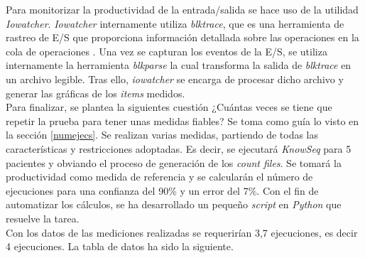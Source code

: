 


Para monitorizar la productividad de la entrada/salida se hace uso de la utilidad \textit{Iowatcher}. \textit{Iowatcher} internamente utiliza \textit{blktrace}, que es una herramienta de rastreo de E/S que proporciona información detallada sobre las operaciones en la cola de operaciones \cite{blktrace}. Una vez se capturan los eventos de la E/S, se utiliza internamente la herramienta \textit{blkparse} la cual transforma la salida de \textit{blktrace} en un archivo legible. Tras ello, \textit{iowatcher} se encarga de procesar dicho archivo y generar las gráficas de los \textit{items} medidos.\\

Para finalizar, se plantea la siguientes cuestión ¿Cuántas veces se tiene que repetir la prueba para tener unas medidas fiables? Se toma como guía lo visto en la sección \ref{numejecs}. Se realizan varias medidas, partiendo de todas las características y restricciones adoptadas. Es decir, se ejecutará \textit{KnowSeq} para 5 pacientes y obviando el proceso de generación de los \textit{count files}. Se tomará la productividad como medida de referencia y se calcularán el número de ejecuciones para una confianza del 90\% y un error del 7\%. Con el fin de automatizar los cálculos, se ha desarrollado un pequeño \textit{script} en \textit{Python} que resuelve la tarea.\\

 Con los datos de las mediciones realizadas se requerirían 3,7 ejecuciones, es decir 4 ejecuciones. La tabla de datos ha sido la siguiente.

\begin{table}[h]
    \centering
    \caption{Productividad y número de ejecuciones necesarias para KnowSeq}
    \label{tab:my_label}
\end{table}


